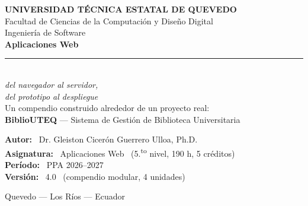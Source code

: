 \documentclass[11pt,a4paper,twoside,openright]{book}
\begin{document}
\color{textogris}

\pagestyle{empty}
\begin{titlepage}
    \vspace*{0.8cm}
    \begin{center}
        {\color{uteqverde}\bfseries\Large UNIVERSIDAD T\'ECNICA ESTATAL DE QUEVEDO}\\[4pt]
        {\color{textogris}\small Facultad de Ciencias de la Computaci\'on y Dise\~no Digital}\\[2pt]
        {\color{textogris}\small Ingenier\'ia de Software}\\[3cm]

        {\color{tinta}\bfseries\fontsize{40}{44}\selectfont Aplicaciones Web}\\[8pt]
        {\color{uteqoro}\rule{0.7\linewidth}{2.4pt}}\\[16pt]

        {\color{uteqverdeo}\Large\itshape del navegador al servidor,\\[2pt]
        del prototipo al despliegue}\\[3cm]

        {\color{textogris}\normalsize
            Un compendio construido alrededor de un proyecto real:\\[2pt]
            \textbf{BiblioUTEQ} --- Sistema de Gesti\'on de Biblioteca Universitaria}\\[3.4cm]
    \end{center}

    \begin{flushleft}
        \textbf{Autor:} \, Dr. Gleiston Cicer\'on Guerrero Ulloa, Ph.D.\\[3pt]
        \textbf{Asignatura:} \, Aplicaciones Web \, (5.\textsuperscript{to} nivel, 190 h, 5 cr\'editos)\\[3pt]
        \textbf{Per\'iodo:} \, PPA 2026--2027\\[3pt]
        \textbf{Versi\'on:} \, 4.0 \, (compendio modular, 4 unidades)
    \end{flushleft}
    \vfill
    \begin{center}
        {\color{textogris}\small Quevedo --- Los R\'ios --- Ecuador}
    \end{center}
\end{titlepage}
\cleardoublepage
\end{document}

